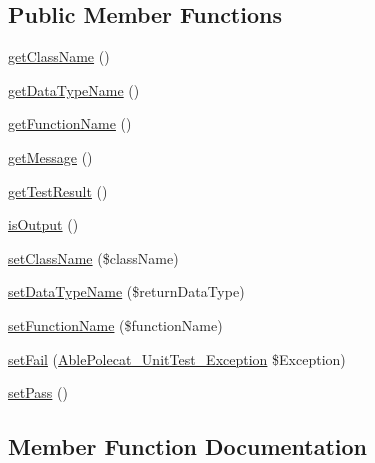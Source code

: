\subsection*{Public Member Functions}
\begin{DoxyCompactItemize}
\item 
\hyperlink{interface_able_polecat___unit_test___result_interface_ab8f8ee56588ebf5091c288e44ebdfaf4}{get\+Class\+Name} ()
\item 
\hyperlink{interface_able_polecat___unit_test___result_interface_a421c174cc65a05486ea4659687808ff8}{get\+Data\+Type\+Name} ()
\item 
\hyperlink{interface_able_polecat___unit_test___result_interface_aa07f3ffd609a5269623ad54a64bf04d3}{get\+Function\+Name} ()
\item 
\hyperlink{interface_able_polecat___unit_test___result_interface_a0b0e611236742aac18ba1936d03ba89a}{get\+Message} ()
\item 
\hyperlink{interface_able_polecat___unit_test___result_interface_a4dea8388951eb7e76706838bf090a400}{get\+Test\+Result} ()
\item 
\hyperlink{interface_able_polecat___unit_test___result_interface_abb0f17d16c1ac7ab049a7e8dfc35fde2}{is\+Output} ()
\item 
\hyperlink{interface_able_polecat___unit_test___result_interface_aaf49e68e9856c8fc687f4a70febdbcb2}{set\+Class\+Name} (\$class\+Name)
\item 
\hyperlink{interface_able_polecat___unit_test___result_interface_a3b23db2045766e8ad1d9a1fdc2865cac}{set\+Data\+Type\+Name} (\$return\+Data\+Type)
\item 
\hyperlink{interface_able_polecat___unit_test___result_interface_a8b654a17e4a52e665f3916ab14c02945}{set\+Function\+Name} (\$function\+Name)
\item 
\hyperlink{interface_able_polecat___unit_test___result_interface_ab2838506be47781e65c544b6079c0d2a}{set\+Fail} (\hyperlink{class_able_polecat___unit_test___exception}{Able\+Polecat\+\_\+\+Unit\+Test\+\_\+\+Exception} \$Exception)
\item 
\hyperlink{interface_able_polecat___unit_test___result_interface_a73d4c4adb8e41947fceaef0bd012ef0d}{set\+Pass} ()
\end{DoxyCompactItemize}


\subsection{Member Function Documentation}
\hypertarget{interface_able_polecat___unit_test___result_interface_ab8f8ee56588ebf5091c288e44ebdfaf4}{}
